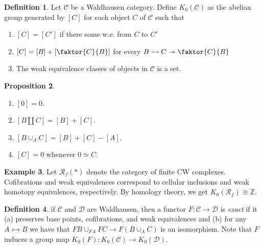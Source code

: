 \documentclass[10pt,letterpaper,cm]{nupset}
\theoremstyle{definition}
\newtheorem{definition}{Definition}
\newtheorem{exmp}[definition]{Example}
\theoremstyle{theorem}
\newtheorem{prop}[definition]{Proposition}
\theoremstyle{remark}
\newcommand{\Z}{\mathbb Z}
\newcommand{\1}{\mathbf{1}}
\renewcommand{\c}{\mathscr{C}}
\renewcommand{\d}{\mathscr{D}}
\newcommand{\0}{\vec 0}
\begin{document}
\begin{definition}
Let $\c$ be a Waldhausen category. Define $K_0(\c)$ as the abelian group generated by $[C]$ for each object $C$ of $\c$ such that
\begin{enumerate}
\item $[C] = [C']$ if there some w.e. from $C$ to $C'$
\item $[C] = [B] + [\faktor{C}{B}]$ for every $B \rightarrowtail  C \twoheadrightarrow \faktor{C}{B}$
\item The weak equivalence classes of objects in $\c$ is a set.
\end{enumerate}
\end{definition}

\begin{prop} $ $
\begin{enumerate}
\item $[0] = 0$.
\item $[B \coprod C] = [B] +[C]$.
\item $[B \cup_A C] = [B]+[C]-[A]$.
\item $[C]= 0$ whenever $0 \simeq C$.
\end{enumerate}
\end{prop}

\begin{exmp}
Let $\mathcal{R}_f(\ast)$ denote the category of finite CW complexes. Cofibrations and weak equivalences correspond to cellular inclusions  and weak homotopy equivalences, respectively. By homology theory, we get $K_0(\mathcal{R}_f) \cong \Z$.
\end{exmp}

\begin{definition}
if $\c$ and $\d$ are Waldhausen, then a functor $F: \c \to \d$ is \textit{exact} if it (a) preserves base points, cofibrations, and weak equivalences and (b) for any $A \rightarrowtail B$ we have that $FB \cup_{FA} FC \to F(B\cup_A C)$ is an isomorphism. Note that $F$ induces a group map $K_0(F) :K_0(\c) \to K_0(\d)$.
\end{definition}
\end{document}
